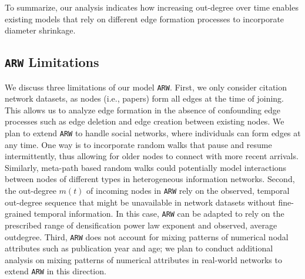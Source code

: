 To summarize, our analysis indicates how increasing out-degree over time enables
existing models that rely on different edge formation processes to incorporate
diameter shrinkage.


\subsection{\texttt{ARW} Limitations}
We discuss three limitations of our model \texttt{ARW}.
First, we only consider citation network datasets, as nodes (i.e., papers) form
all edges at the time of joining. This allows us to analyze edge formation in
the absence of confounding edge processes such as edge deletion and edge
creation between existing nodes. We plan to extend \texttt{ARW} to handle social
networks, where individuals can form edges at any time. One way is to
incorporate random walks that pause and resume intermittently, thus allowing for
older nodes to connect with more recent arrivals.  Similarly, meta-path based
random walks could potentially model interactions between nodes of different
types in heterogeneous information networks.
Second, the out-degree $m(t)$ of incoming nodes in \texttt{ARW} rely on the
observed, temporal out-degree sequence that might be unavailable in network
datasets without fine-grained temporal information. In this case, \texttt{ARW}
can be adapted to rely on the prescribed range of densification power law
exponent \cite{leskovec2005graphs} and observed, average outdegree.
Third, \texttt{ARW} does not account for mixing patterns of numerical nodal attributes
such as publication year and age; we plan to conduct additional analysis on mixing
patterns of numerical attributes in real-world networks to extend \texttt{ARW} in
this direction.


